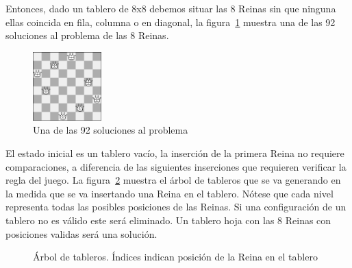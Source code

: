 \documentclass[letter, 10pt]{article}
\begin{document}
Entonces, dado un tablero de 8x8 debemos situar las 8 Reinas sin que ninguna ellas coincida en fila, columna o en diagonal, la figura~\ref{fig:8queens} muestra una de las 92 soluciones al problema de las 8 Reinas.

\begin{figure}[H]
    \begin{center}
        \includegraphics[width=100px,height=100px,keepaspectratio]{images/8queens}
        \caption{Una de las 92 soluciones al problema}
        \label{fig:8queens}
    \end{center}
\end{figure}

El estado inicial es un tablero vacío, la inserción de la primera Reina no requiere comparaciones, a diferencia de las siguientes inserciones que requieren verificar la regla del juego. La figura~\ref{fig:queen_tree} muestra el árbol de tableros que se va generando en la medida que se va insertando una Reina en el tablero. Nótese que cada nivel representa todas las posibles posiciones de las Reinas. Si una configuración de un tablero no es válido este será eliminado. Un tablero hoja con las 8 Reinas con posiciones validas será una solución.

\begin{figure}[H]
    \centering
    \caption{Árbol de tableros. Índices indican posición de la Reina en el tablero}
    \label{fig:queen_tree}
\end{figure}
\end{document}

